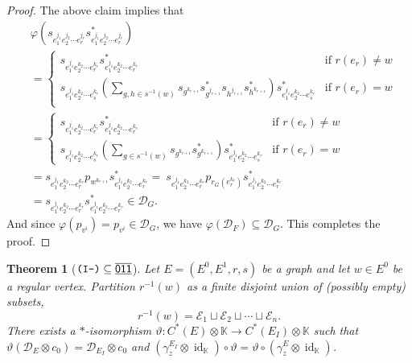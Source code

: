 \documentclass[12pt]{amsbook}%
\renewcommand{\phi}{\varphi}
\renewcommand{\theta}{\vartheta}
\newtheorem{theor}{Theorem}[section]
\theoremstyle{defin}
\theoremstyle{remark}
\numberwithin{equation}{chapter}
\numberwithin{theor}{section}
\newcommand{\K}{\mathbb{K}}
\newcommand{\xyzrel}[1]{\mbox{$\overline{\underline{\mathsf{ #1}}}$}}
\newcommand{\IIIm}{\mbox{\texttt{\textup{(I-)}}}}
\newcommand{\id}{\operatorname{id}}
\begin{document}
\begin{proof}
The above claim implies that 
\begin{align*}
&\phi ( s_{ e_1^{j_1} e_{2}^{j_2} \cdots e_r^{j_r}}  s_{ e_1^{j_1} e_{2}^{j_2} \cdots e_r^{j_r}}^* ) \\
&= 
\begin{cases}
s_{ e_1^{ j_1 } e_2^{ k_2 } \cdots e_{r}^{k_r}} s_{ e_1^{ j_1 } e_2^{ k_2 } \cdots e_{r}^{k_r}}^*  &\text{if } r( e_r ) \neq w \\
s_{ e_1^{ j_1 } e_2^{ k_2 } \cdots e_{s}^{k_r} } \left( \sum_{g, h \in s^{-1} (w) } s_{ g^{ k_{r+1} } } s_{ g^{ j_{r+1} }}^* s_{ h^{ j_{r+1} }}s_{ h^{ k_{r+1} } }^* \right) s_{ e_1^{ j_1 } e_2^{ k_2 } \cdots e_{s}^{k_r} }^* 
&\text{if  } r(e_r)=w\\
\end{cases} \\
&= 
\begin{cases}
s_{ e_1^{ j_1 } e_2^{ k_2 } \cdots e_{r}^{k_r}} s_{ e_1^{ j_1 } e_2^{ k_2 } \cdots e_{r}^{k_r}}^*  &\text{if } r( e_r ) \neq w \\
s_{ e_1^{ j_1 } e_2^{ k_2 } \cdots e_{s}^{k_r} } \left( \sum_{g \in s^{-1} (w) } s_{ g^{ k_{r+1} } } s_{ g^{ k_{r+1} } }^* \right) s_{ e_1^{ j_1 } e_2^{ k_2 } \cdots e_{s}^{k_r} }^* 
&\text{if  } r(e_r)=w
\end{cases} \\
&= s_{ e_1^{ j_1 } e_2^{ k_2 } \cdots e_{r}^{k_r}}  p_{w^{k_{r+1}}} s_{ e_1^{ j_1 } e_2^{ k_2 } \cdots e_{r}^{k_r}}^* = \ s_{ e_1^{ j_1 } e_2^{ k_2 } \cdots e_{r}^{k_r}}  p_{r_G( e_r^{k_r} ) } s_{ e_1^{ j_1 } e_2^{ k_2 } \cdots e_{r}^{k_r}}^* \\
&= s_{ e_1^{ j_1 } e_2^{ k_2 } \cdots e_{r}^{k_r}} s_{ e_1^{ j_1 } e_2^{ k_2 } \cdots e_{r}^{k_r}}^*  \in \mathcal{D}_G.
\end{align*}
And since $\phi ( p_{v^i} ) = p_{v^i} \in \mathcal{D}_G$, we have $\phi ( \mathcal{D}_F ) \subseteq \mathcal{D}_G$.  This completes the proof. %
\end{proof}


\begin{theor}[$\IIIm\subseteq \xyzrel{011}$]\label{thm:insplitting2}
Let $E = ( E^0, E^1, r , s )$ be a graph and let $w \in E^0$ be a regular vertex.  Partition $r^{-1} (w)$ as a finite disjoint union of (possibly empty) subsets,
\[
r^{-1} (w) = \mathcal{E}_1 \sqcup \mathcal{E}_2 \sqcup \cdots \sqcup \mathcal{E}_n.
\]
There exists a $*$-isomorphism $\theta \colon C^*(E) \otimes \K \to C^*(E_I) \otimes \K$ such that $\theta ( \mathcal{D}_{E} \otimes c_0 ) = \mathcal{D}_{E_I} \otimes c_0 $ and $(\gamma_z^{E_I} \otimes \id_{ \K } ) \circ \theta = \theta \circ (\gamma_z^{E} \otimes \id_{ \K })$.
\end{theor}
\end{document}
